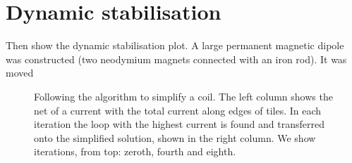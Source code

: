 \section{Dynamic stabilisation}

Then show the dynamic stabilisation plot. A large permanent magnetic dipole was constructed (two neodymium magnets connected with an iron rod). It was moved

\begin{figure}
  \centering
  \quad
  \caption{Following the algorithm to simplify a coil. The left column shows the net of a current with the total current along edges of tiles. In each iteration the loop with the highest current is found and transferred onto the simplified solution, shown in the right column. We show iterations, from top: zeroth, fourth and eighth.}
  \label{fig:prototype_compensation_time}
\end{figure}


